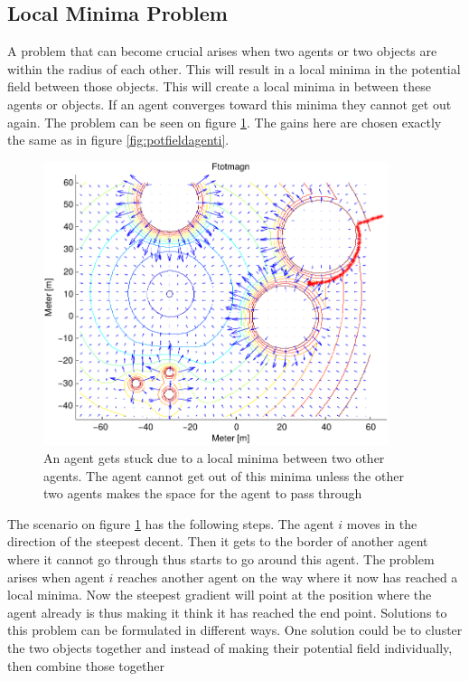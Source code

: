 \subsection{Local Minima Problem}
A problem that can become crucial arises when two agents or two
objects are within the radius of each other. This will result in a
local minima in the potential field between those objects. This will
create a local minima in between these agents or objects. If an
agent converges toward this minima they cannot get out again. The
problem can be seen on figure \ref{fig:roevproblem}. The gains here
are chosen exactly the same as in figure \ref{fig:potfieldagenti}.
\begin{figure}[htbp]
  \includegraphics[width=0.9\textwidth]{fig/ftotmagnfigpdf3}
	\caption{An agent gets stuck due to a local minima between two other
	agents. The agent cannot get out of this minima unless the other two
	agents makes the space for the agent to pass through}
  \label{fig:roevproblem}
\end{figure}
The scenario on figure \ref{fig:roevproblem} has the following steps.
The agent $i$ moves in the direction of the steepest decent. Then it
gets to the border of another agent where it cannot go through thus
starts to go around this agent. The problem arises when agent $i$
reaches another agent on the way where it now has reached a local
minima. Now the steepest gradient will point at the position where the
agent already is thus making it think it has reached the end point.
Solutions to this problem can be formulated in different ways. One
solution could be to cluster the two objects together and instead of
making their potential field individually, then combine those together
